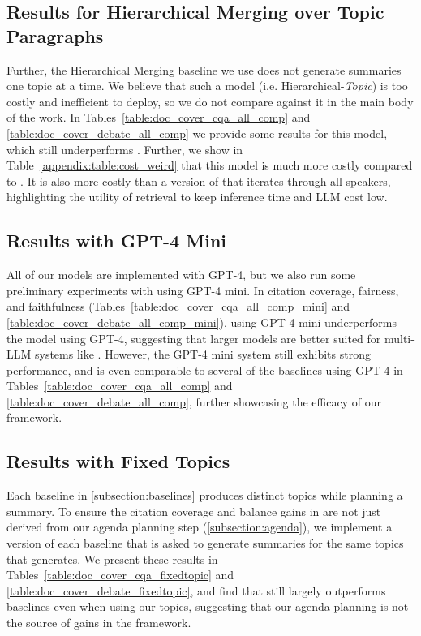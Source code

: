\subsection{Results for Hierarchical Merging over Topic Paragraphs} \label{appendix:results_hm}

Further, the Hierarchical Merging baseline we use does not generate summaries one topic at a time.
We believe that such a model (i.e. Hierarchical-\emph{Topic}) is too costly and inefficient to deploy, so we do not compare against it in the main body of the work. 
In Tables~\ref{table:doc_cover_cqa_all_comp} and \ref{table:doc_cover_debate_all_comp} we provide some results for this model, which still underperforms \modelTopic.
Further, we show in Table~\ref{appendix:table:cost_weird} that this model is much more costly compared to \model.
It is also more costly than a version of \model that iterates through all speakers, highlighting the utility of retrieval to keep inference time and LLM cost low.

\subsection{Results with GPT-4 Mini} \label{appendix:results_mini}

All of our models are implemented with GPT-4, but we also run some preliminary experiments with \modelTopic using GPT-4 mini.
In citation coverage, fairness, and faithfulness (Tables~\ref{table:doc_cover_cqa_all_comp_mini} and \ref{table:doc_cover_debate_all_comp_mini}), \modelTopic using GPT-4 mini underperforms the model using GPT-4, suggesting that larger models are better suited for multi-LLM systems like \model. However, the GPT-4 mini system still exhibits strong performance, and is even comparable to several of the baselines using GPT-4 in Tables~\ref{table:doc_cover_cqa_all_comp} and \ref{table:doc_cover_debate_all_comp}, further showcasing the efficacy of our framework.

\subsection{Results with Fixed Topics} \label{appendix:fixed_topics}

Each baseline in \cref{subsection:baselines} produces distinct topics while planning a summary.
To ensure the citation coverage and balance gains in \model are not just derived from our agenda planning step (\cref{subsection:agenda}), we implement a version of each baseline that is asked to generate summaries for the same topics that \modelTopic generates.
We present these results in Tables~\ref{table:doc_cover_cqa_fixedtopic} and \ref{table:doc_cover_debate_fixedtopic}, and find that \model still largely outperforms baselines even when using our topics, suggesting that our agenda planning is not the source of gains in the framework.

